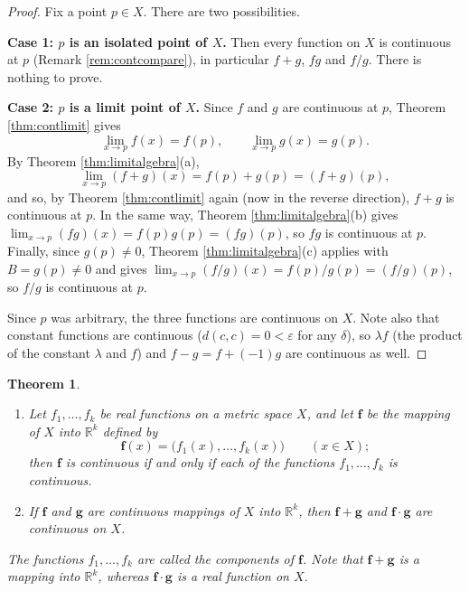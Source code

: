 \documentclass{article}
\theoremstyle{mythm}
\newtheorem{theorem}{Theorem}[section]
\begin{document}
\begin{proof}
Fix a point $p \in X$. There are two possibilities.

\textbf{Case 1: $p$ is an isolated point of $X$.} Then every function on $X$ is continuous at $p$ (Remark \ref{rem:contcompare}), in particular $f+g$, $fg$ and $f/g$. There is nothing to prove.

\textbf{Case 2: $p$ is a limit point of $X$.} Since $f$ and $g$ are continuous at $p$, Theorem \ref{thm:contlimit} gives
\[
\lim_{x\to p} f(x) = f(p), \qquad \lim_{x\to p} g(x) = g(p).
\]
By Theorem \ref{thm:limitalgebra}(a),
\[
\lim_{x \to p} (f+g)(x) = f(p) + g(p) = (f+g)(p),
\]
and so, by Theorem \ref{thm:contlimit} again (now in the reverse direction), $f+g$ is continuous at $p$. In the same way, Theorem \ref{thm:limitalgebra}(b) gives $\lim_{x\to p} (fg)(x) = f(p)g(p) = (fg)(p)$, so $fg$ is continuous at $p$. Finally, since $g(p) \neq 0$, Theorem \ref{thm:limitalgebra}(c) applies with $B = g(p) \neq 0$ and gives $\lim_{x\to p} (f/g)(x) = f(p)/g(p) = (f/g)(p)$, so $f/g$ is continuous at $p$.

Since $p$ was arbitrary, the three functions are continuous on $X$. Note also that constant functions are continuous ($d(c,c) = 0 < \varepsilon$ for any $\delta$), so $\lambda f$ (the product of the constant $\lambda$ and $f$) and $f - g = f + (-1)g$ are continuous as well.
\end{proof}

\begin{theorem}\label{thm:components}
\begin{enumerate}[label=(\alph*)]
    \item Let $f_1, \dots, f_k$ be real functions on a metric space $X$, and let $\mathbf{f}$ be the mapping of $X$ into $\mathbb{R}^k$ defined by
    \[
    \mathbf{f}(x) = \big(f_1(x), \dots, f_k(x)\big) \qquad (x \in X);
    \]
    then $\mathbf{f}$ is continuous if and only if each of the functions $f_1, \dots, f_k$ is continuous.
    \item If $\mathbf{f}$ and $\mathbf{g}$ are continuous mappings of $X$ into $\mathbb{R}^k$, then $\mathbf{f} + \mathbf{g}$ and $\mathbf{f} \cdot \mathbf{g}$ are continuous on $X$.
\end{enumerate}
The functions $f_1, \dots, f_k$ are called the \textit{components} of $\mathbf{f}$. Note that $\mathbf{f} + \mathbf{g}$ is a mapping into $\mathbb{R}^k$, whereas $\mathbf{f} \cdot \mathbf{g}$ is a real function on $X$.
\end{theorem}
\end{document}

